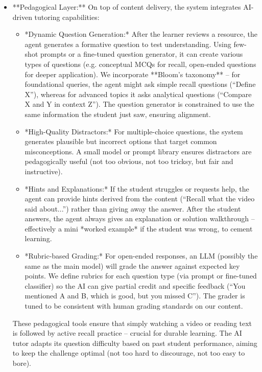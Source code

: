 \documentclass[11pt]{article}
\begin{document}
\begin{itemize}
  \item **Pedagogical Layer:** On top of content delivery, the system integrates AI-driven tutoring capabilities:
    \begin{itemize}
      \item *Dynamic Question Generation:* After the learner reviews a resource, the agent generates a formative question to test understanding. Using few-shot prompts or a fine-tuned question generator, it can create various types of questions (e.g. conceptual MCQs for recall, open-ended questions for deeper application). We incorporate **Bloom’s taxonomy** – for foundational queries, the agent might ask simple recall questions (“Define X”), whereas for advanced topics it asks analytical questions (“Compare X and Y in context Z”). The question generator is constrained to use the same information the student just saw, ensuring alignment.
      \item *High-Quality Distractors:* For multiple-choice questions, the system generates plausible but incorrect options that target common misconceptions. A small model or prompt library ensures distractors are pedagogically useful (not too obvious, not too tricksy, but fair and instructive).
      \item *Hints and Explanations:* If the student struggles or requests help, the agent can provide hints derived from the content (“Recall what the video said about...”) rather than giving away the answer. After the student answers, the agent always gives an explanation or solution walkthrough – effectively a mini *worked example* if the student was wrong, to cement learning.
      \item *Rubric-based Grading:* For open-ended responses, an LLM (possibly the same as the main model) will grade the answer against expected key points. We define rubrics for each question type (via prompt or fine-tuned classifier) so the AI can give partial credit and specific feedback (“You mentioned A and B, which is good, but you missed C”). The grader is tuned to be consistent with human grading standards on our content.
    \end{itemize}
    These pedagogical tools ensure that simply watching a video or reading text is followed by active recall practice – crucial for durable learning. The AI tutor adapts its question difficulty based on past student performance, aiming to keep the challenge optimal (not too hard to discourage, not too easy to bore).

\end{itemize}
\end{document}
